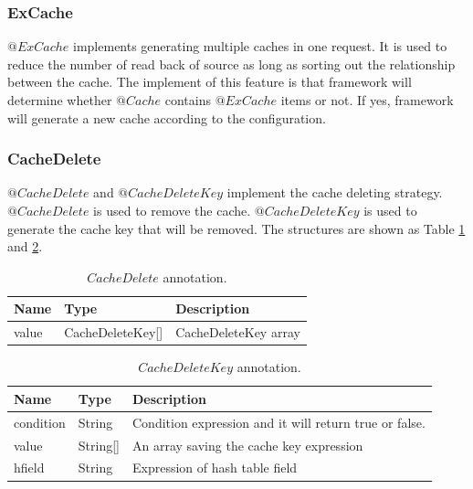\documentclass{singlecol-new}
\theoremstyle{TH}{
\newtheorem{lemma}{Lemma}
\newtheorem{theorem}[lemma]{Theorem}
\newtheorem{corrolary}[lemma]{Corrolary}
\newtheorem{conjecture}[lemma]{Conjecture}
\newtheorem{proposition}[lemma]{Proposition}
\newtheorem{claim}[lemma]{Claim}
\newtheorem{stheorem}[lemma]{Wrong Theorem}
}
\theoremstyle{THrm}{
\newtheorem{definition}{Definition}[section]
\newtheorem{question}{Question}[section]
\newtheorem{remark}{Remark}
\newtheorem{scheme}{Scheme}
}
\theoremstyle{THhit}{
\newtheorem{case}{Case}[section]
}
\begin{document}
\subsubsection{ExCache}
$@ExCache$ implements generating multiple caches in one request. It is used to reduce the number of read back of source as long as sorting out the relationship between the cache. The implement of this feature is that framework will determine whether $@Cache$ contains $@ExCache$ items or not. If yes, framework will generate a new cache according to the configuration.

\subsubsection{CacheDelete}
$@CacheDelete$ and $@CacheDeleteKey$ implement the cache deleting strategy. $@CacheDelete$ is used to remove the cache. $@CacheDeleteKey$ is used to generate the cache key that will be removed. The structures are shown as Table \ref{CacheDelete} and \ref{CacheDeleteKey}.

\begin{table}[htb]
\begin{center}
 \caption{\label{CacheDelete}$CacheDelete$ annotation.}
 \begin{tabular}{lll}
 \toprule
Name & Type & Description\\
 \midrule
value & CacheDeleteKey[] & CacheDeleteKey array\\
\bottomrule
 \end{tabular}
\end{center}
\end{table}

\begin{table}[htb]
\begin{center}
 \caption{\label{CacheDeleteKey}$CacheDeleteKey$ annotation.}
 \begin{tabular}{lll}
 \toprule
Name & Type & Description\\
 \midrule
condition & String & Condition expression and it will return true or false.\\ %
value & String[] & An array saving the cache key expression\\
hfield & String & Expression of hash table field\\
\bottomrule
 \end{tabular}
\end{center}
\end{table}
\end{document}
